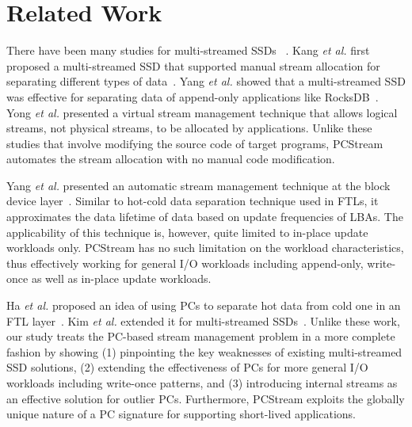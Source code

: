 \vspace{-10pt}
\section{Related Work}
\vspace{-5pt}

There have been many studies for multi-streamed SSDs ~\cite{MultiStream, Level,
vStream, FStream, AutoStream, PCStream}.  Kang {\it et al.} first proposed a
multi-streamed SSD that supported manual stream allocation for separating
different types of data~\cite{MultiStream}.  Yang {\it et al.} showed that a
multi-streamed SSD was effective for separating data of append-only
applications like RocksDB~\cite{Level}.  Yong {\it et al.} presented a virtual
stream management technique that allows logical streams, not physical streams,
to be allocated by applications.  Unlike these studies that involve modifying
the source code of target programs, \textsf{\small PCStream} automates the
stream allocation with no manual code modification.

\begin{comment}
Rho {\it et al.} proposed a stream management technique, called FStream, at the
file system layer~\cite{FStream}. In FStream, metadata, journal
data, and user data that may have different lifetime characteristics were
allocated to separate streams.  Since FStream was implemented as a part of a file
system, it was not able to directly detect application's I/O behaviors.
Also, it may be hard to be deployed in practice due to 
a strong dependence on file system-specific implementation details.
\textsf{\small PCStream}, on the other hand, efficiently exploits
programs' I/O behaviors using PCs with no file system-specific modifications.
\end{comment}

Yang {\it et al.} presented an automatic stream management technique at the
block device layer~\cite{AutoStream}. Similar to hot-cold data separation
technique used in FTLs, it approximates the data lifetime of data based on
update frequencies of LBAs.  The applicability of this technique is, however,
quite limited to in-place update workloads only.  \textsf{\small PCStream} has
no such limitation on the workload characteristics, thus effectively working
for general I/O workloads including append-only, write-once 
as well as in-place update workloads.

Ha {\it et al.} proposed an idea of using PCs to separate hot data from cold
one in an FTL layer~\cite{PCHa}.  Kim {\it et al.} extended it for
multi-streamed SSDs~\cite{PCStream}.  Unlike these work, our study treats the
PC-based stream management problem in a more complete fashion by showing (1)
pinpointing the key weaknesses of existing multi-streamed SSD solutions, (2)
extending the effectiveness of PCs for more general I/O workloads including
write-once patterns, and (3) introducing internal streams as an effective
solution for outlier PCs.  Furthermore, \textsf{\small PCStream} exploits the
globally unique nature of a PC signature for supporting short-lived
applications.

